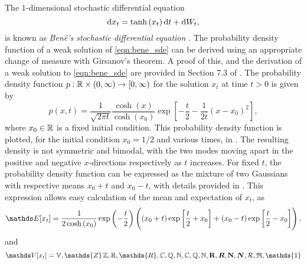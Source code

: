 \begin{example}
	The \(1\)-dimensional stochastic differential equation
	\begin{equation}
		\sde{x_t}{\tanh\left(x_t\right)}{},
		\label{eqn:bene_sde}
	\end{equation}
	is known as \emph{Ben\^e's stochastic differential equation} \cite{SarkkaSolin_2019_AppliedStochasticDifferential}.
	The probability density function of a weak solution of \eqref{eqn:bene_sde} can be derived using an appropriate change of measure with Girsanov's theorem.
	A proof of this, and the derivation of a weak solution to \eqref{eqn:bene_sde} are provided in Section 7.3 of \cite{SarkkaSolin_2019_AppliedStochasticDifferential}.
	The probability density function \(p: \mathbb{R} \times \left(0,\infty\right) \to \left[0,\infty\right)\) for the solution \(x_t\) at time \(t > 0\) is given by
	\begin{equation}\label{eqn:bene_sde_pdf}
		p(x,t) = \frac{1}{\sqrt{2\pi t}}\frac{\cosh\left(x\right)}{\cosh\left(x_0\right)}\exp\left[-\frac{t}{2} - \frac{1}{2t}\left(x - x_0\right)^2\right],
	\end{equation}
	where \(x_0 \in \mathbb{R}\) is a fixed initial condition.
	This probability density function is plotted, for the initial condition \(x_0 = 1/2\) and various times, in .
	The resulting density is not symmetric and bimodal, with the two modes moving apart in the positive and negative \(x\)-directions respectively as \(t\) increases.
	For fixed \(t\), the probability density function can be expressed as the mixture of two Gaussians with respective means \(x_0 + t\) and \(x_0 - t\), with details provided in .
	This expression allows easy calculation of the mean and expectation of \(x_t\), as
	\[
		\avg{x_t} = \frac{1}{2\cosh\left(x_0\right)}\exp\left(-\frac{t}{2}\right)\left(\left(x_0 + t\right)\exp\left[\frac{t}{2} +x_0\right] + (x_0 - t)\exp\left[\frac{t}{2} - x_0\right]\right).
	\]
	and
	\[
		\var{x_t} = \mathbb{V}, \mathds{Z} \,  \mathbb{Z}, \R, \mathds{R}, \mathbb{C}, \mathbb{Q}, \mathbb{N}, \C, \Q, \N, \mathbf{R}, \bm{R}, \mathbf{N}, \bm{N}, \mathcal{R}, \mathfrak{R}, \mathds{1}
	\]
\end{example}


\newcommand{\plotbenepdf}[2]{
	\begin{tikzpicture}\begin{axis}[
				ymin=0.0,
				xmin=-10.0,
				xmax=10.0,
				axis lines=center,
				axis on top=true,
				domain=-10:10,
				ylabel=$p$,
				xlabel=$x$,
				ytick=\empty,
				yticklabels={},
			]
			\addplot [mark=none,draw=black,thick,samples=500] {cosh(\x)*exp(-#2/2-1/(2 * #2)*(\x-#1)^2)/((2 * pi * #2)^(1/2) * cosh(#1))};
		\end{axis}
	\end{tikzpicture}
}

